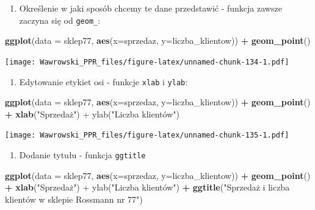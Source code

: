 \documentclass[]{book}
\newenvironment{Shaded}{\begin{snugshade}}{\end{snugshade}}
\newcommand{\KeywordTok}[1]{\textcolor[rgb]{0.13,0.29,0.53}{\textbf{#1}}}
\newcommand{\DataTypeTok}[1]{\textcolor[rgb]{0.13,0.29,0.53}{#1}}
\newcommand{\StringTok}[1]{\textcolor[rgb]{0.31,0.60,0.02}{#1}}
\newcommand{\OperatorTok}[1]{\textcolor[rgb]{0.81,0.36,0.00}{\textbf{#1}}}
\newcommand{\NormalTok}[1]{#1}
\providecommand{\tightlist}{%
  \setlength{\itemsep}{0pt}\setlength{\parskip}{0pt}}
\begin{document}
\begin{enumerate}
\def\labelenumi{\arabic{enumi}.}
\setcounter{enumi}{1}
\tightlist
\item
  Określenie w jaki sposób chcemy te dane przedstawić - funkcja zawsze
  zaczyna się od \texttt{geom\_}:
\end{enumerate}

\begin{Shaded}
\begin{Highlighting}[]
\KeywordTok{ggplot}\NormalTok{(}\DataTypeTok{data =}\NormalTok{ sklep77, }\KeywordTok{aes}\NormalTok{(}\DataTypeTok{x=}\NormalTok{sprzedaz, }\DataTypeTok{y=}\NormalTok{liczba_klientow)) }\OperatorTok{+}
\StringTok{  }\KeywordTok{geom_point}\NormalTok{()}
\end{Highlighting}
\end{Shaded}

\texttt{[image: Wawrowski\_PPR\_files/figure-latex/unnamed-chunk-134-1.pdf]}

\begin{enumerate}
\def\labelenumi{\arabic{enumi}.}
\setcounter{enumi}{2}
\tightlist
\item
  Edytowanie etykiet osi - funkcje \texttt{xlab} i \texttt{ylab}:
\end{enumerate}

\begin{Shaded}
\begin{Highlighting}[]
\KeywordTok{ggplot}\NormalTok{(}\DataTypeTok{data =}\NormalTok{ sklep77, }\KeywordTok{aes}\NormalTok{(}\DataTypeTok{x=}\NormalTok{sprzedaz, }\DataTypeTok{y=}\NormalTok{liczba_klientow)) }\OperatorTok{+}
\StringTok{  }\KeywordTok{geom_point}\NormalTok{() }\OperatorTok{+}
\StringTok{  }\KeywordTok{xlab}\NormalTok{(}\StringTok{"Sprzedaż") +}
\StringTok{  ylab("}\NormalTok{Liczba klientów")}
\end{Highlighting}
\end{Shaded}

\texttt{[image: Wawrowski\_PPR\_files/figure-latex/unnamed-chunk-135-1.pdf]}

\begin{enumerate}
\def\labelenumi{\arabic{enumi}.}
\setcounter{enumi}{3}
\tightlist
\item
  Dodanie tytułu - funkcja \texttt{ggtitle}
\end{enumerate}

\begin{Shaded}
\begin{Highlighting}[]
\KeywordTok{ggplot}\NormalTok{(}\DataTypeTok{data =}\NormalTok{ sklep77, }\KeywordTok{aes}\NormalTok{(}\DataTypeTok{x=}\NormalTok{sprzedaz, }\DataTypeTok{y=}\NormalTok{liczba_klientow)) }\OperatorTok{+}
\StringTok{  }\KeywordTok{geom_point}\NormalTok{() }\OperatorTok{+}
\StringTok{  }\KeywordTok{xlab}\NormalTok{(}\StringTok{"Sprzedaż") +}
\StringTok{  ylab("}\NormalTok{Liczba klientów") }\OperatorTok{+}
\StringTok{  }\KeywordTok{ggtitle}\NormalTok{(}\StringTok{"Sprzedaż i liczba klientów w sklepie Rossmann nr 77"}\NormalTok{)}
\end{Highlighting}
\end{Shaded}
\end{document}

